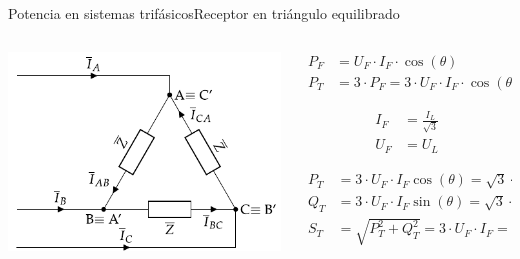 \documentclass[aspectratio=169, xcolor={usenames,svgnames,dvipsnames}]{beamer}
\begin{document}
\begin{frame}{Potencia en sistemas trifásicos}{Receptor en triángulo equilibrado}
\begin{columns}
\begin{column}{0.4\columnwidth}
\begin{center}
\includegraphics[width=.9\linewidth]{../figs/TrianguloEquilibrado_Receptor.pdf}
\end{center}
\end{column}

\begin{column}{0.6\columnwidth}
\begin{align*}
P_F &= U_F\cdot I_F\cdot\cos(\theta)\\
  P_T &= 3 \cdot P_F= 3 \cdot U_F\cdot I_F \cdot\cos(\theta)
\end{align*}

\begin{align*}
  I_F &= \frac{I_L}{\sqrt{3}}\\
  U_F &= {U_L}
\end{align*}

\begin{align*}
  P_T &= 3\cdot U_F \cdot I_F \cos(\theta) = \sqrt{3}\cdot  U_L \cdot I_L\cdot \cos(\theta)\\
  Q_T &= 3\cdot U_F \cdot I_F \sin(\theta) = \sqrt{3}\cdot  U_L \cdot I_L\cdot \sin(\theta)\\
  S_T &= \sqrt{P_T^2 + Q_T^2} = 3\cdot U_F\cdot I_F = \sqrt{3}\cdot U_L\cdot I_L
\end{align*}
\end{column}
\end{columns}
\end{frame}
\end{document}
